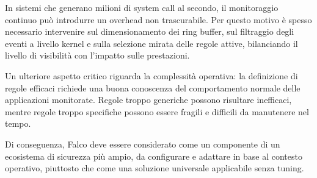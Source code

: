 In sistemi che generano milioni di system call al secondo, il monitoraggio continuo può introdurre un overhead non trascurabile. Per questo motivo è spesso necessario intervenire sul dimensionamento dei ring buffer, sul filtraggio degli eventi a livello kernel e sulla selezione mirata delle regole attive, bilanciando il livello di visibilità con l’impatto sulle prestazioni.

Un ulteriore aspetto critico riguarda la complessità operativa: la definizione di regole efficaci richiede una buona conoscenza del comportamento normale delle applicazioni monitorate. Regole troppo generiche possono risultare inefficaci, mentre regole troppo specifiche possono essere fragili e difficili da manutenere nel tempo.

Di conseguenza, Falco deve essere considerato come un componente di un ecosistema di sicurezza più ampio, da configurare e adattare in base al contesto operativo, piuttosto che come una soluzione universale applicabile senza tuning.

